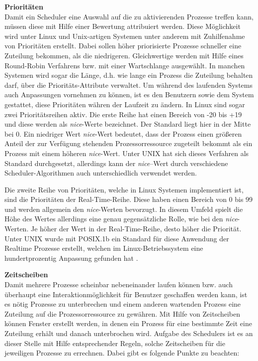 \textbf{Prioritäten}\\
Damit ein Scheduler eine Auswahl auf die zu aktivierenden Prozesse treffen kann, müssen diese mit Hilfe einer Bewertung attribuiert werden. Diese Möglichkeit wird unter Linux und Unix-artigen Systemen unter anderem mit Zuhilfenahme von Prioritäten erstellt.
Dabei sollen höher priorisierte Prozesse schneller eine Zuteilung bekommen, als die niedrigeren. Gleichwertige werden mit Hilfe eines Round-Robin Verfahrens bzw. mit einer Wartschlange ausgewählt. In manchen Systemen wird sogar die Länge, d.h. wie lange ein Prozess die Zuteilung behalten darf, über die Prioritäts-Attribute verwaltet. Um während des laufenden Systems auch Anpassungen vornehmen zu kön\-nen, ist es den Benutzern sowie dem System gestattet, diese Prioritäten währen der Laufzeit zu ändern.
In Linux sind sogar zwei Prioritäts\-reihen aktiv. Die erste Reihe hat einen Bereich von -20 bis +19 und diese werden als \textit{nice}-Werte bezeichnet. Der Standard liegt hier in der Mitte bei 0. Ein niedriger Wert \textit{nice}-Wert bedeutet, dass der Prozess einen größeren Anteil der zur Verfügung stehenden Prozessorressource zugeteilt bekommt als ein Prozess mit einem höheren \textit{nice}-Wert.
Unter UNIX hat sich dieses Verfahren als Standard durchgesetzt, allerdings kann der \textit{nice}--Wert durch verschiedene Scheduler-Algorithmen auch unterschiedlich verwendet werden.

Die zweite Reihe von Prioritäten, welche in Linux Systemen implementiert ist, sind die Prioritäten der Real-Time-Reihe. Diese haben einen Bereich von 0 bis 99 und werden allgemein den \textit{nice}-Werten bevorzugt. In diesem Umfeld spielt die Höhe des Wertes allerdings eine genau gegensätzliche Rolle,  wie bei den \textit{nice}-Werten. Je höher der Wert in der Real-Time-Reihe, desto höher die Priorität. Unter UNIX wurde mit POSIX.1b ein Standard für diese Anwendung der Realtime Prozesse erstellt, welchen im Linux-Betriebssystem eine hundertprozentig Anpassung gefunden hat \cite{rlove}.

\textbf{Zeitscheiben}\\
Damit mehrere Prozesse scheinbar nebeneinander laufen können bzw. auch überhaupt eine Interaktionmöglichkeit für Benutzer geschaffen werden kann, ist es nötig Prozesse zu unterbrechen und einem anderen wartenden Prozess eine Zuteilung auf die Prozessor\-ressource zu gewähren. Mit Hilfe von Zeitscheiben können Fenster erstellt werden, in denen ein Prozess für eine bestimmte Zeit eine Zuteilung erhält und danach unterbrochen wird.
Aufgabe des Schedulers ist es an dieser Stelle mit Hilfe entsprechender Regeln, solche Zeitscheiben  für die jeweiligen Prozesse zu errechnen. Dabei gibt es folgende Punkte zu beachten:

